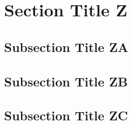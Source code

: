 
\clearpage
\section{Section Title Z}
\label{sec:section-z}


\subsection{Subsection Title ZA}
\label{sec:subsection-za}


\subsection{Subsection Title ZB}
\label{sec:subsection-zb}


\subsection{Subsection Title ZC}
\label{sec:subsection-zc}


